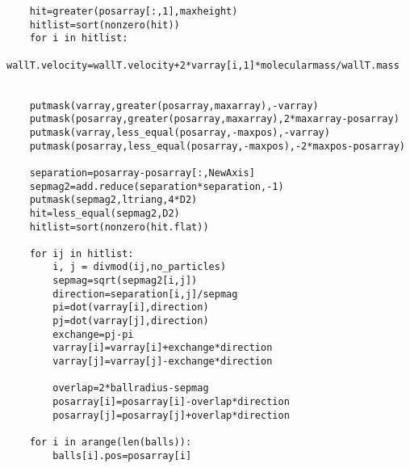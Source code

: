 \documentclass[a4]{article}
\begin{document}
{\begin{verbatim}
    hit=greater(posarray[:,1],maxheight)
    hitlist=sort(nonzero(hit))
    for i in hitlist:
        wallT.velocity=wallT.velocity+2*varray[i,1]*molecularmass/wallT.mass


    putmask(varray,greater(posarray,maxarray),-varray)
    putmask(posarray,greater(posarray,maxarray),2*maxarray-posarray)
    putmask(varray,less_equal(posarray,-maxpos),-varray)
    putmask(posarray,less_equal(posarray,-maxpos),-2*maxpos-posarray)

    separation=posarray-posarray[:,NewAxis]
    sepmag2=add.reduce(separation*separation,-1)
    putmask(sepmag2,ltriang,4*D2)
    hit=less_equal(sepmag2,D2)
    hitlist=sort(nonzero(hit.flat))

    for ij in hitlist:
        i, j = divmod(ij,no_particles)
        sepmag=sqrt(sepmag2[i,j])
        direction=separation[i,j]/sepmag
        pi=dot(varray[i],direction)
        pj=dot(varray[j],direction)
        exchange=pj-pi
        varray[i]=varray[i]+exchange*direction
        varray[j]=varray[j]-exchange*direction

        overlap=2*ballradius-sepmag
        posarray[i]=posarray[i]-overlap*direction
        posarray[j]=posarray[j]+overlap*direction

    for i in arange(len(balls)):
        balls[i].pos=posarray[i]

\end{verbatim}}

\end{document}
